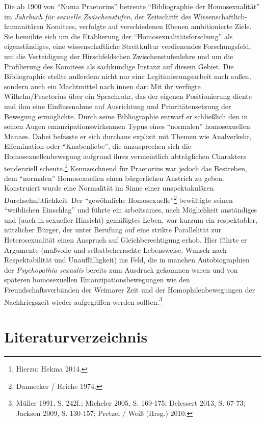 \documentclass[a4paper,
fontsize=11pt,
oneside,
numbers=noperiodatend,
parskip=half-,
bibliography=totoc,
final
]{scrartcl}
\begin{document}
Die ab 1900 von \enquote{Numa Praetorius} betreute
\enquote{Bibliographie der Homosexualität} im \emph{Jahrbuch für
sexuelle Zwischenstufen}, der Zeitschrift des
Wissenschaftlich-humanitären Komitees, verfolgte auf verschiedenen
Ebenen ambitionierte Ziele. Sie bemühte sich um die Etablierung der
\enquote{Homosexualitätsforschung} als eigenständiges, eine
wissenschaftliche Streitkultur verdienendes Forschungsfeld, um die
Verteidigung der Hirschfeldschen Zwischenstufenlehre und um die
Profilierung des Komitees als sachkundige Instanz auf diesem Gebiet. Die
Bibliographie stellte außerdem nicht nur eine Legitimierungsarbeit nach
außen, sondern auch ein Machtmittel nach innen dar: Mit ihr verfügte
Wilhelm/Praetorius über ein Sprachrohr, das der eigenen Positionierung
diente und ihm eine Einflussnahme auf Ausrichtung und Prioritätensetzung
der Bewegung ermöglichte. Durch seine Bibliographie entwarf er
schließlich den in seinen Augen emanzipationswirksamen Typus eines
\enquote{normalen} homosexuellen Mannes. Dabei befasste er sich durchaus
explizit mit Themen wie Analverkehr, Effemination oder
\enquote{Knabenliebe}, die anzusprechen sich die Homosexuellenbewegung
aufgrund ihres vermeintlich abträglichen Charakters tendenziell
scheute.\footnote{Hierzu: Hekma 2014.} Kennzeichnend für Praetorius war
jedoch das Bestreben, dem \enquote{normalen} Homosexuellen einen
bürgerlichen Anstrich zu geben. Konstruiert wurde eine Normalität im
Sinne einer unspektakulären Durchschnittlichkeit. Der
\enquote{gewöhnliche Homosexuelle}\footnote{Dannecker / Reiche 1974.}
bewältigte seinen \enquote{weiblichen Einschlag} und führte ein
arbeitsames, nach Möglichkeit anständiges und (auch in sexueller
Hinsicht) gemäßigtes Leben, war kurzum ein respektabler, nützlicher
Bürger, der unter Berufung auf eine strikte Parallelität zur
Heterosexualität einen Anspruch auf Gleichberechtigung erhob. Hier
führte er Argumente (maßvolle und selbstbeherrschte Lebensweise, Wunsch
nach Respektabilität und Unauffälligkeit) ins Feld, die in manchen
Autobiographien der \emph{Psychopathia sexualis} bereits zum Ausdruck
gekommen waren und von späteren homosexuellen Emanzipationsbewegungen
wie den Freundschaftsverbänden der Weimarer Zeit und der
Homophilenbewegungen der Nachkriegszeit wieder aufgegriffen werden
sollten.\footnote{Müller 1991, S. 242f.; Micheler 2005, S. 169-175;
  Delessert 2013, S. 67-73; Jackson 2009, S. 130-157; Pretzel / Weiß
  (Hrsg.) 2010.}

\section*{Literaturverzeichnis}\label{literaturverzeichnis}
\end{document}
